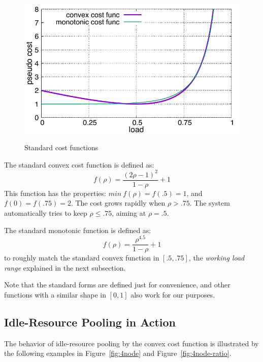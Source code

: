 \begin{figure}[tb]
  \begin{center}
    \includegraphics[width=1.0\columnwidth]{costfunc.pdf}
    \vspace{-2.0ex}
    \caption{Standard cost functions}
    \label{fig:std_costfunc}
  \end{center}
\end{figure}

The standard convex cost function is defined as:
\begin{equation*}
	f(\rho) = \frac{(2\rho - 1)^{2}}{1 - \rho} + 1
\end{equation*}
This function has the properties:
$min\: f(\rho) = f(.5) = 1$, and $f(0) = f(.75) = 2$.
The cost grows rapidly when $\rho > .75$.
The system automatically tries to keep $\rho \le .75$,
aiming at $\rho = .5$.

The standard monotonic function is defined as:
\begin{equation*}
	f(\rho) = \frac{\rho^{4.5}}{1 - \rho} + 1
\end{equation*}
to roughly match the standard convex function in $[.5, .75]$,
the {\em working load range} explained in the next subsection.

Note that the standard forms are defined just for convenience, and
other functions with a similar shape in $[0,1]$ also work for our
purposes.

\subsection{Idle-Resource Pooling in Action}

The behavior of idle-resource pooling by the convex cost function is
illustrated by the following examples in Figure~\ref{fig:4node} and
Figure~\ref{fig:4node-ratio}.


